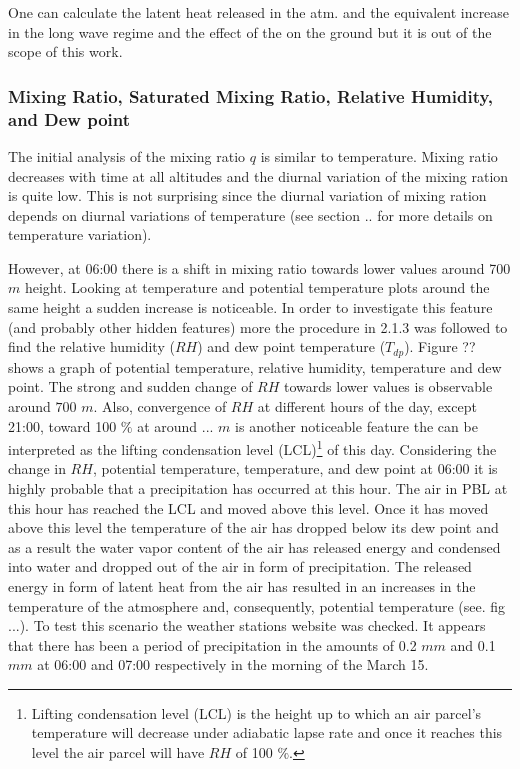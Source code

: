 \documentclass[a4paper,12pt]{article}
\numberwithin{equation}{section} %
\begin{document}
One can calculate the latent heat released in the atm. and the equivalent increase in the long wave regime and the effect of the on the ground but it is out of the scope of this work.

\subsubsection{Mixing Ratio, Saturated Mixing Ratio, Relative Humidity, and Dew point}

The initial analysis of the mixing ratio $q$ is similar to temperature. Mixing ratio decreases with time at all altitudes and the diurnal variation of the mixing ration is quite low. This is not surprising since the diurnal variation of mixing ration depends on diurnal variations of temperature (see section .. for more details on temperature variation). 

However, at 06:00 there is a shift in mixing ratio towards lower values around 700 $m$ height. Looking at temperature and potential temperature plots around the same height a sudden increase is noticeable. In order to investigate this feature (and probably other hidden features) more the procedure in 2.1.3 was followed to find the relative humidity ($RH$) and dew point temperature ($T_{dp}$). Figure ?? shows a graph of potential temperature, relative humidity, temperature and dew point. The strong and sudden change of $RH$ towards lower values is observable around $700$ $m$. Also, convergence of $RH$ at different hours of the day, except 21:00, toward 100 $\%$ at around ... $m$ is another noticeable feature the can be interpreted as the lifting condensation level (LCL)\footnote{Lifting condensation level (LCL) is the height up to which an air parcel's temperature will decrease under adiabatic lapse rate and once it reaches this level the air parcel will have $RH$ of 100 $\%$.} of this day. Considering the change in $RH$, potential temperature, temperature, and dew point at 06:00 it is highly probable that a precipitation has occurred at this hour. The air in PBL at this hour has reached the LCL and moved above this level. Once it has moved above this level the temperature of the air has dropped below its dew point and as a result the water vapor content of the air has released energy and condensed into water and dropped out of the air in form of precipitation. The released energy in form of latent heat from the air has resulted in an increases in the temperature of the atmosphere and, consequently, potential temperature (see. fig ...). To test this scenario the weather stations website was checked. It appears that there has been a period of precipitation in the amounts of 0.2 $mm$ and 0.1 $mm$ at 06:00 and 07:00 respectively in the morning of the March 15.
 
\end{document}
